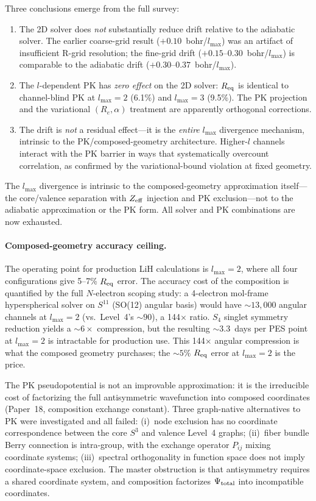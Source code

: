 \documentclass[aps,pra,twocolumn,superscriptaddress,longbibliography,floatfix]{revtex4-2}
\begin{document}
Three conclusions emerge from the full survey:
\begin{enumerate}
  \item The 2D solver does \emph{not} substantially reduce drift
    relative to the adiabatic solver.  The earlier coarse-grid result
    ($+0.10$~bohr/$l_{\max}$) was an artifact of insufficient R-grid
    resolution; the fine-grid drift ($+0.15$--$0.30$~bohr/$l_{\max}$)
    is comparable to the adiabatic drift ($+0.30$--$0.37$~bohr/$l_{\max}$).
  \item The $l$-dependent PK has \emph{zero effect} on the 2D solver:
    $R_{\rm eq}$ is identical to channel-blind PK at $l_{\max} = 2$
    (6.1\%) and $l_{\max} = 3$ (9.5\%).  The PK projection and the
    variational $(R_e, \alpha)$ treatment are apparently orthogonal
    corrections.
  \item The drift is \emph{not} a residual effect---it is the
    \emph{entire} $l_{\max}$ divergence mechanism, intrinsic to the
    PK/composed-geometry architecture.  Higher-$l$ channels interact
    with the PK barrier in ways that systematically overcount
    correlation, as confirmed by the variational-bound violation at
    fixed geometry.
\end{enumerate}
The $l_{\max}$ divergence is intrinsic to the composed-geometry
approximation itself---the core/valence separation with $Z_{\rm eff}$
injection and PK exclusion---not to the adiabatic approximation or
the PK form.  All solver and PK combinations are now exhausted.

\paragraph{Composed-geometry accuracy ceiling.}
The operating point for production LiH calculations is $l_{\max} = 2$,
where all four configurations give 5--7\% $R_{\rm eq}$ error.
The accuracy cost of the composition is quantified by the
full $N$-electron scoping study: a 4-electron mol-frame hyperspherical
solver on $S^{11}$ (SO(12) angular basis) would have ${\sim}13{,}000$
angular channels at $l_{\max} = 2$ (vs.\ Level~4's ${\sim}90$),
a 144$\times$ ratio.  $S_4$ singlet symmetry reduction yields a
${\sim}6\times$ compression, but the resulting ${\sim}3.3$~days per
PES point at $l_{\max} = 2$ is intractable for production use.
This 144$\times$ angular compression is what the composed geometry
purchases; the ${\sim}5\%$ $R_{\rm eq}$ error at $l_{\max} = 2$ is
the price.

The PK pseudopotential is not an improvable approximation: it is the
irreducible cost of factorizing the full antisymmetric wavefunction
into composed coordinates (Paper~18, composition exchange constant).
Three graph-native alternatives to PK were investigated and all failed:
(i)~node exclusion has no coordinate correspondence between the core
$S^3$ and valence Level~4 graphs; (ii)~fiber bundle Berry connection
is intra-group, with the exchange operator $P_{ij}$ mixing coordinate
systems; (iii)~spectral orthogonality in function space does not imply
coordinate-space exclusion.  The master obstruction is that
antisymmetry requires a shared coordinate system, and composition
factorizes $\Psi_{\rm total}$ into incompatible coordinates.
\end{document}
